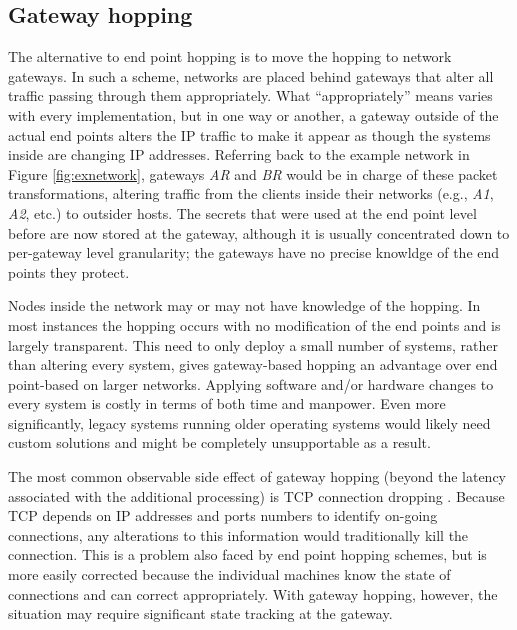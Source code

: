 \subsection{Gateway hopping}
\label{sec:gateway_hopping}
\par The alternative to end point hopping is to move the hopping to network gateways. In such a scheme, networks are placed behind gateways that alter all traffic passing through them appropriately. What ``appropriately'' means varies with every implementation, but in one way or another, a gateway outside of the actual end points alters the IP traffic to make it appear as though the systems inside are changing IP addresses. Referring back to the example network in Figure \ref{fig:exnetwork}, gateways \textit{AR} and \textit{BR} would be in charge of these packet transformations, altering traffic from the clients inside their networks (e.g., \textit{A1}, \textit{A2}, etc.) to outsider hosts. The secrets that were used at the end point level before are now stored at the gateway, although it is usually concentrated down to per-gateway level granularity; the gateways have no precise knowldge of the end points they protect.

\par Nodes inside the network may or may not have knowledge of the hopping. In most instances the hopping occurs with no modification of the end points and is largely transparent.  This need to only deploy a small number of systems, rather than altering every system, gives gateway-based hopping an advantage over end point-based on larger networks. Applying software and/or hardware changes to every system is costly in terms of both time and manpower. Even more significantly, legacy systems running older operating systems would likely need custom solutions and might be completely unsupportable as a result.

\par The most common observable side effect of gateway hopping (beyond the latency associated with the additional processing) is \ac{TCP} connection dropping . Because TCP depends on IP addresses and ports numbers to identify on-going connections, any alterations to this information would traditionally kill the connection. This is a problem also faced by end point hopping schemes, but is more easily corrected because the individual machines know the state of connections and can correct appropriately. With gateway hopping, however, the situation may require significant state tracking at the gateway.

